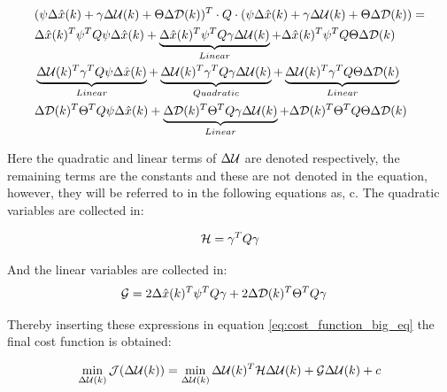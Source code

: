 \begin{equation}\label{eq:cost_function_big_eq}
	\begin{aligned}
	&(\psi\Delta \hat{x}(k) + \gamma\Delta \CMcal{U}(k) + \Theta\Delta \CMcal{D}(k))^T\cdot Q \cdot (\psi\Delta \hat{x}(k) + \gamma\Delta \CMcal{U}(k) + \Theta\Delta \CMcal{D}(k)) = \\
	& \Delta \hat{x}(k)^T\psi ^T Q \psi \Delta \hat{x}(k) + \underbrace{\Delta \hat{x}(k)^T \psi ^T Q \gamma \Delta  \CMcal{U}(k) }_{Linear} +\Delta \hat{x}(k)^T \psi ^T Q \Theta \Delta \CMcal{D}(k) \\
	& \underbrace{\Delta \CMcal{U}(k)^T \gamma ^T Q \psi\Delta \hat{x}(k)}_{Linear} + \underbrace{\Delta \CMcal{U}(k)^T\gamma ^T Q \gamma\Delta \CMcal{U}(k)}_{Quadratic} +\underbrace{\Delta \CMcal{U}(k)^T \gamma ^T Q\Theta \Delta \CMcal{D}(k)}_{Linear} \\ 
	& \Delta \CMcal{D}(k)^T \Theta ^T Q  \psi \Delta \hat{x}(k)					+ \underbrace{\Delta \CMcal{D}(k)^T \Theta ^T Q \gamma  \Delta \CMcal{U}(k) }_{Linear}	+\Delta \CMcal{D}(k)^T \Theta ^T Q \Theta \Delta \CMcal{D}(k)
	\end{aligned}
\end{equation}

Here the quadratic and linear terms of $\Delta \CMcal{U}$ are denoted respectively, the remaining terms are the constants and these are not denoted in the equation, however, they will be referred to in the following equations as, c. The quadratic variables are collected in: 

\begin{equation}\label{eq:quadratic_h_matrix}
	\CMcal{H} = \gamma^T Q\gamma 
\end{equation}

And the linear variables are collected in:
\begin{equation}
	\begin{aligned}
	\CMcal{G} &= 2 \Delta \hat{x}(k)^T\psi^T Q \gamma+2 \Delta \CMcal{D}(k)^T\Theta^T Q \gamma 
	\end{aligned}
\end{equation}

Thereby inserting these expressions in equation \ref{eq:cost_function_big_eq} the final cost function is obtained:

\begin{equation}\label{eq:the_cost_function}
	\min_{\Delta \CMcal{U}(k)} \CMcal{J}(\Delta \CMcal{U}(k)) =\min_{\Delta \CMcal{U}(k)} \Delta \CMcal{U}(k)^T\CMcal{H}\Delta \CMcal{U}(k)+\CMcal{G}\Delta \CMcal{U}(k)+c
\end{equation}

